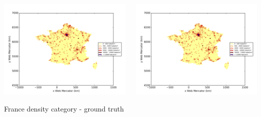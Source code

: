 \documentclass[c]{beamer}
\begin{document}
\begin{frame}
\begin{columns}
 \begin{column}{0.5\textwidth}
  \begin{overlayarea}{\linewidth}{4cm}
    \centering\vfill
    \includegraphics[scale=0.25]{../../data/France/test/Nearest_Neighboors_Classification/Nearest_Neighboors_Classification/density_ground_truth.png}
  \end{overlayarea}
  \begin{overlayarea}{\linewidth}{0.5cm}
    \centering
    \tiny France density category - ground truth\par
  \end{overlayarea}
 \end{column}
 \begin{column}{0.5\textwidth}
  \begin{overlayarea}{\linewidth}{4cm}
    \centering\vfill
    \includegraphics[scale=0.25]{../../data/France/test/Nearest_Neighboors_Classification/Nearest_Neighboors_Classification/density_classification.png}

\end{overlayarea}
\end{column}
\end{columns}
\end{frame}
\end{document}
